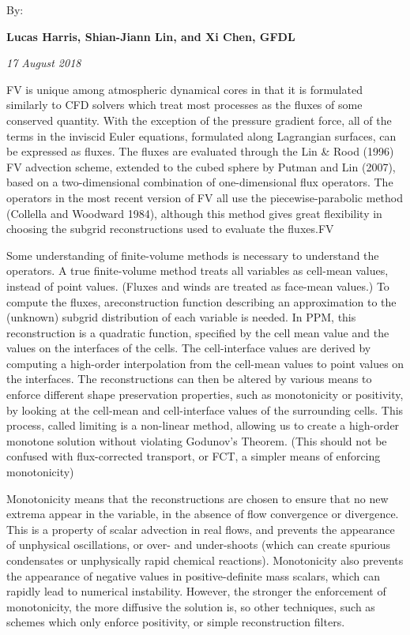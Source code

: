 By\+:

{\bfseries Lucas Harris, Shian-\/\+Jiann Lin, and Xi Chen, G\+F\+DL}

{\itshape 17 August 2018}

FV\textthreesuperior{} is unique among atmospheric dynamical cores in that it is formulated similarly to C\+FD solvers which treat most processes as the fluxes of some conserved quantity. With the exception of the pressure gradient force, all of the terms in the inviscid Euler equations, formulated along Lagrangian surfaces, can be expressed as fluxes. The fluxes are evaluated through the Lin \& Rood (1996) FV advection scheme, extended to the cubed sphere by Putman and Lin (2007), based on a two-\/dimensional combination of one-\/dimensional flux operators. The operators in the most recent version of FV\textthreesuperior{} all use the piecewise-\/parabolic method (Collella and Woodward 1984), although this method gives great flexibility in choosing the subgrid reconstructions used to evaluate the fluxes.\+FV\textthreesuperior{}

Some understanding of finite-\/volume methods is necessary to understand the operators. A true finite-\/volume method treats all variables as cell-\/mean values, instead of point values. (Fluxes and winds are treated as face-\/mean values.) To compute the fluxes, a ​reconstruction​ function describing an approximation to the (unknown) subgrid distribution of each variable is needed. In P\+PM, this reconstruction is a quadratic function, specified by the cell mean value and the values on the interfaces of the cells. The cell-\/interface values are derived by computing a high-\/order interpolation from the cell-\/mean values to point values on the interfaces. The reconstructions can then be altered by various means to enforce different shape preservation properties, such as monotonicity or positivity, by looking at the cell-\/mean and cell-\/interface values of the surrounding cells. This process, called ​limiting​ is a ​non-\/linear​ method, allowing us to create a high-\/order monotone solution without violating Godunov’s Theorem. (This should not be confused with flux-\/corrected transport, or F\+CT, a simpler means of enforcing monotonicity)

Monotonicity means that the reconstructions are chosen to ensure that no new extrema appear in the variable, in the absence of flow convergence or divergence. This is a property of scalar advection in real flows, and prevents the appearance of unphysical oscillations, or over-\/ and under-\/shoots (which can create spurious condensates or unphysically rapid chemical reactions). Monotonicity also prevents the appearance of negative values in positive-\/definite mass scalars, which can rapidly lead to numerical instability. However, the stronger the enforcement of monotonicity, the more diffusive the solution is, so other techniques, such as schemes which only enforce positivity, or simple reconstruction filters.

